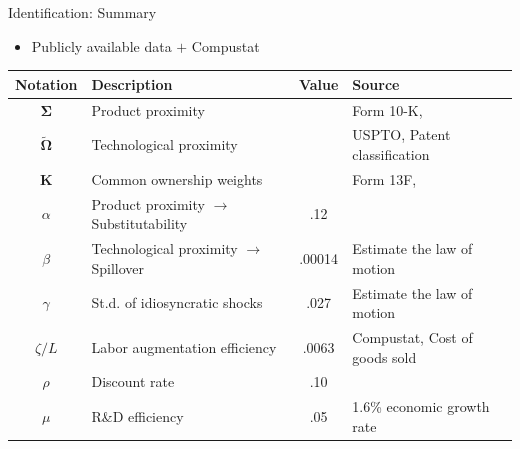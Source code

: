 \documentclass[
  aspectratio=169,  %
]{beamer}
\theoremstyle{plain}
\begin{document}
%
\begin{frame}{Identification: Summary}
  \begin{itemize}
    \item Publicly available data $+$ Compustat
  \end{itemize}
  \begin{center}
    \begin{tabular}{clcl}
      Notation                            & Description                                      & Value  & Source\tabularnewline
      \hline
      $\symbf{\Sigma}$                      & Product proximity                                &        & Form 10-K, \citet{Hoberg2016-jm}\tabularnewline
      $\symbf{\widetilde{\Omega}}$ & Technological proximity                          &        & USPTO, Patent classification\tabularnewline
      $\symbf{K}$                                 & Common ownership weights                         &        & Form 13F, \citet{Backus2021-yt}\tabularnewline
      $\alpha$                            & Product proximity $\rightarrow$ Substitutability & .12    & \citet{Pellegrino2024-dn}\tabularnewline
      $\beta$                             & Technological proximity $\rightarrow$ Spillover  & .00014 & Estimate the law of motion\tabularnewline
      $\gamma$                            & St.d. of idiosyncratic shocks                    & .027   & Estimate the law of motion\tabularnewline
      $\zeta/L$                           & Labor augmentation efficiency                    & .0063  & Compustat, Cost of goods sold\tabularnewline
      $\rho$                              & Discount rate                                    & .10    & \tabularnewline
      $\mu$                               & R\&D efficiency                                  & .05    & 1.6\% economic growth rate\tabularnewline
    \end{tabular}
    \par\end{center}

\end{frame}
%
\end{document}
